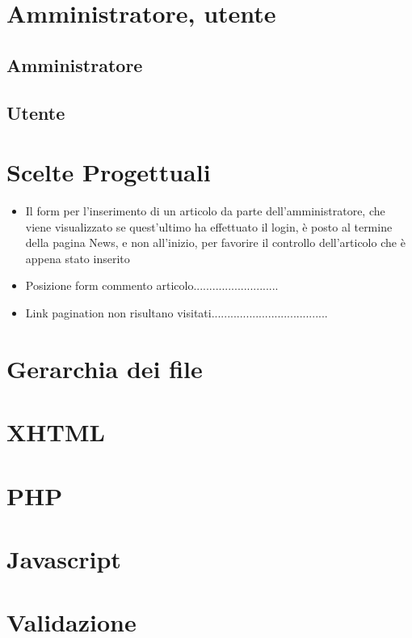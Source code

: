 \documentclass[10pt, a4paper]{article}
\begin{document}
\section{Amministratore, utente}

\subsection{Amministratore}

\subsection{Utente}

\section{Scelte Progettuali}
\begin{itemize}
	\item{Il form per l'inserimento di un articolo da parte dell'amministratore, che viene visualizzato se quest'ultimo ha effettuato il login, è posto al termine della pagina News, e non all'inizio, per favorire il controllo dell'articolo che è appena stato inserito}
	\item{Posizione form commento articolo...........................}
	\item{Link pagination non risultano visitati.....................................}
\end{itemize}

\section{Gerarchia dei file}

\section{XHTML}

\section{PHP}

\section{Javascript}

\section{Validazione}
\end{document}
